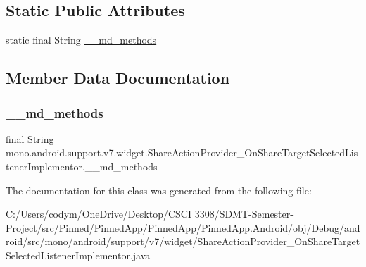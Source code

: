 \subsection*{Static Public Attributes}
\begin{DoxyCompactItemize}
\item 
static final String \hyperlink{classmono_1_1android_1_1support_1_1v7_1_1widget_1_1_share_action_provider___on_share_target_selected_listener_implementor_a32a6cc09bf050bf79d6e842469167e17}{\+\_\+\+\_\+md\+\_\+methods}
\end{DoxyCompactItemize}


\subsection{Member Data Documentation}
\mbox{\label{classmono_1_1android_1_1support_1_1v7_1_1widget_1_1_share_action_provider___on_share_target_selected_listener_implementor_a32a6cc09bf050bf79d6e842469167e17}} 
\subsubsection{\texorpdfstring{\+\_\+\+\_\+md\+\_\+methods}{\_\_md\_methods}}
{\footnotesize\ttfamily final String mono.\+android.\+support.\+v7.\+widget.\+Share\+Action\+Provider\+\_\+\+On\+Share\+Target\+Selected\+Listener\+Implementor.\+\_\+\+\_\+md\+\_\+methods\hspace{0.3cm}{\ttfamily [static]}}



The documentation for this class was generated from the following file\+:\begin{DoxyCompactItemize}
\item 
C\+:/\+Users/codym/\+One\+Drive/\+Desktop/\+C\+S\+C\+I 3308/\+S\+D\+M\+T-\/\+Semester-\/\+Project/src/\+Pinned/\+Pinned\+App/\+Pinned\+App/\+Pinned\+App.\+Android/obj/\+Debug/android/src/mono/android/support/v7/widget/Share\+Action\+Provider\+\_\+\+On\+Share\+Target\+Selected\+Listener\+Implementor.\+java\end{DoxyCompactItemize}
